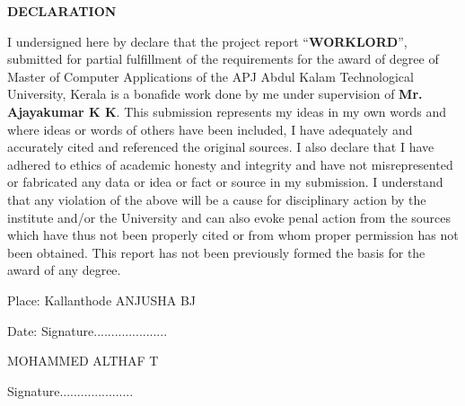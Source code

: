 \documentclass[a4paper,12pt]{report}
\begin{document}
\pagebreak


{\centering \bf \large
	DECLARATION\par
}

\vspace*{20pt}
{\normalsize I undersigned here by declare that the project report “{\bf WORKLORD}”, submitted for partial fulfillment of the requirements for the award of degree of Master
	of Computer Applications of the APJ Abdul Kalam Technological University, Kerala is a bonafide
	work done by me under supervision of {\bf Mr. Ajayakumar K K}. This submission represents my ideas in my
	own words and where ideas or words of others have been included, I have adequately and accurately
	cited and referenced the original sources. I also declare that I have adhered to ethics of academic
	honesty and integrity and have not misrepresented or fabricated any data or idea or fact or source
	in my submission. I understand that any violation of the above will be a cause for disciplinary action
	by the institute and/or the University and can also evoke penal action from the sources which have
	thus not been properly cited or from whom proper permission has not been obtained. This report
	has not been previously formed the basis for the award of any degree. } \\

	
\begin{center}\vspace*{20pt}
	Place: Kallanthode    \hspace*{0pt} \hfill ANJUSHA BJ
\end{center}

\begin{center}\vspace*{10pt}
	Date:      \hspace*{0pt} \hfill Signature.....................
\end{center}

\begin{center}\vspace*{10pt}
\hspace*{0pt} \hfill MOHAMMED ALTHAF T \\
\end{center}

\begin{center}\vspace*{10pt}
\hspace*{0pt} \hfill Signature.....................
\end{center}
\pagebreak
\end{document}
